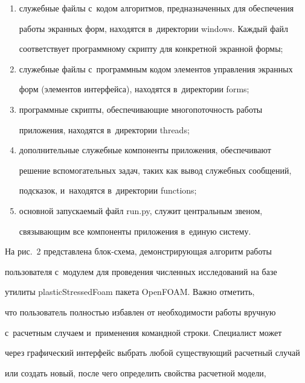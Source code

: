    \begin{enumerate}[(1)]


\item служебные файлы с~кодом алгоритмов, предназначенных для обеспечения 


работы экранных форм, находятся в~директории windows. Каждый файл 


соответствует программному скрипту для конкретной экранной формы;


\item служебные файлы с~программным кодом элементов управления экранных 


форм (элементов интерфейса), находятся в~директории forms;


\item программные скрипты, обеспечивающие многопоточность работы 


приложения, находятся в~директории threads;


\item дополнительные служебные компоненты приложения, обеспечивают 


решение вспомогательных задач, таких как вывод служебных сообщений, 


подсказок, и~находятся в~директории functions;


\item основной запускаемый файл run.py, служит центральным звеном, 


свя\-зы\-ва\-ющим все компоненты приложения в~единую сис\-тему.


\end{enumerate}











   На рис.~2 представлена блок-схема, демонстрирующая алгоритм работы 


пользователя с~модулем для проведения численных исследований на базе 


утилиты \mbox{plasticStressedFoam} пакета \mbox{OpenFOAM}. Важно отметить, 


что пользователь пол\-ностью избавлен от не\-об\-хо\-ди\-мости работы вруч\-ную 


с~расчетным случаем и~применения командной строки. Специалист может 


через графический интерфейс выбрать любой существующий расчетный случай 


или создать новый, после чего определить свойства расчетной модели, 


